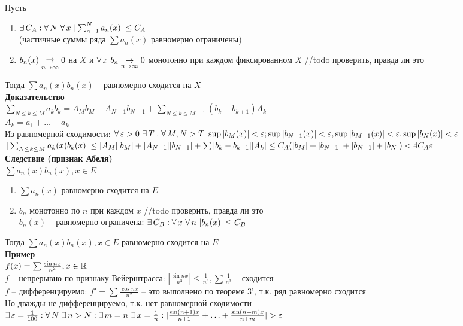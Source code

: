 \documentclass[12pt]{article}
\begin{document}
Пусть \begin{enumerate}
    \item $\ex C_A: \fall N \ \fall x\ |\sum_{n=1}^N a_n(x)|\leq C_A$\\
    (частичные суммы ряда $\sum a_n(x)$ равномерно ограничены)
    \item $b_n(x) \underset{n\rightarrow \infty} {\rightrightarrows} 0$ на $X$ и $\forall\, x\ b_n\underset{n\rightarrow \infty}{\rightarrow} 0$ монотонно при каждом фиксированном $X$  //todo проверить, правда ли это
\end{enumerate}
Тогда $\sum a_n(x)b_n(x)$ -- равномерно сходится на $X$\\
\textbf{Доказательство}\\
$\sum_{N \leq k \leq M} a_kb_k = A_Mb_M - A_{N-1}b_{N-1} + \sum_{N \leq k \leq M-1}(b_k-b_{k+1})A_k$\\
$A_k = a_1 + \ldots + a_k$\\
Из равномерной сходимости: $\fall \eps>0\ \ex T: \fall M,N > T\ \sup|b_M(x)|<\eps;\sup|b_{N-1}(x)|<\eps,\sup|b_{M-1}(x)|<\eps,\sup|b_N(x)|<\eps$\\
$|\sum_{N\leq k \leq M} a_k(x)b_k(x)| \leq |A_M||b_M|+|A_{N-1}||b_{N-1}| + \sum |b_k-b_{k+1}||A_k| \leq C_A(|b_M| + |b_{N-1}|+|b_{N-1}|+|b_N|) < 4C_A\varepsilon$\\
\textbf{Следствие (признак Абеля)}\\
$\sum a_n(x)b_n(x), x \in E$
\begin{enumerate}
    \item $\sum a_n(x)$ равномерно сходится на $E$
    \item $b_n$ монотонно по $n$ при каждом $x$  //todo проверить, правда ли это\\
    $b_n(x)$ -- равномерно ограничена: $\ex C_B: \fall x\ \fall n\ |b_n(x)|\leq C_B$
\end{enumerate}
Тогда $\sum a_n(x)b_n(x), x \in E$ равномерно сходится на $E$\\
\textbf{Пример}\\
$f(x) = \sum \frac{\sin nx}{n^3}, x \in \mathbb{R}$\\
$f$ -- непрерывно по признаку Вейерштрасса: $|\frac{\sin nx}{n^3}| \leq \frac1{n^3}, \sum \frac1{n^3}$ -- сходится\\
$f$ -- дифференцируемо: $f' = \sum \frac{\cos nx}{n^2}$ -- это выполнено по теореме 3', т.к. ряд равномерно сходится\\
Но дважды не дифференцируемо, т.к. нет равномерной сходимости\\
$\exists\, \varepsilon=\frac1{100}: \forall\, N\ \exists\, n > N: \exists\, m=n\ \exists\, x=\frac1n: |\frac{\sin (n+1)x}{n+1} + \ldots + \frac{\sin (n+m)x}{n+m}| > \varepsilon$\\
\end{document}
